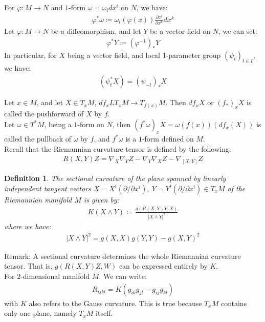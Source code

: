 \documentclass[11pt]{book}
\theoremstyle{break}
\theoremstyle{break}
\newtheorem{defn}{Definition}[corL]
\newcommand{\pd}{\partial}
\newcommand{\remark}{\color{blue}Remark: \color{black}}
\begin{document}
For $\varphi:M \to N$ and $1$-form $\omega = \omega_i dx^i$ on $N$, we have:
\begin{align*}
\varphi^*\omega \coloneqq \omega_i(\varphi(x) ) \frac{\pd z^i}{\pd x^k}dx^k
\end{align*}
Let $\varphi:M \to N$ be a diffeomorphism, and let $Y$ be a vector field on $N$, we can set:
\begin{align*}
\varphi^*Y \coloneqq (\varphi^{-1})_* Y
\end{align*}
In particular, for $X$ being a vector field, and local 1-parameter group $(\psi_{t})_{t \in I}$, we have:
\begin{align*}
\left( \psi_t^*X\right) = \left(\psi_{-t}\right)_* X
\end{align*}

Let $x \in M$, and let $X \in T_xM$, $df_xL T_xM \to T_{f(x)}M$. Then $df_xX$ or $(f_*)_xX$ is called the pushforward of $X$ by $f$. \\

Let $\omega \in T^*M$, being a $1$-form on $N$, then $(f^*\omega)_xX = \omega(f(x)) \left( df_x(X)\right)$ is called the pullback of $\omega$ by $f$, and $f^*\omega$ is a $1$-form defined on $M$.\\


\newpage
Recall that the Riemannian curvature tensor is defined by the following:
\begin{align*}
R(X,Y)Z = \nabla_X\nabla_Y Z - \nabla_Y\nabla_XZ - \nabla_{[X,Y]}Z
\end{align*}
\begin{defn}
The sectional curvature of the plane spanned by linearly independent tangent vectors $X = X^i (\pd/\pd x^i), \ Y = Y^i (\pd/\pd x^i)\in T_xM$ of the Riemannian manifold $M$ is given by:
\begin{align*}
K(X\wedge Y)\coloneqq \frac{g(R(X,Y)Y,X)}{|X\wedge Y|^2}
\end{align*}
where we have:
\begin{align*}
|X\wedge Y|^2 = g(X,X) g(Y,Y) - g(X,Y)^2
\end{align*}
\end{defn}


\remark A sectional curvature determines the whole Riemannian curvature tensor. That is, $g(R(X,Y)Z,W)$ can be expressed entirely by $K$.\\

For $2$-dimensional manifold $M$. We can write:
\begin{align*}
R_{ijkl} = K\left( g_{ik}g_{jl} - g_{ij}g_{kl}\right)
\end{align*} 
with $K$ also refers to the Gauss curvature. This is true because $T_xM$ contains only one plane, namely $T_xM$ itself. \\
\end{document}
